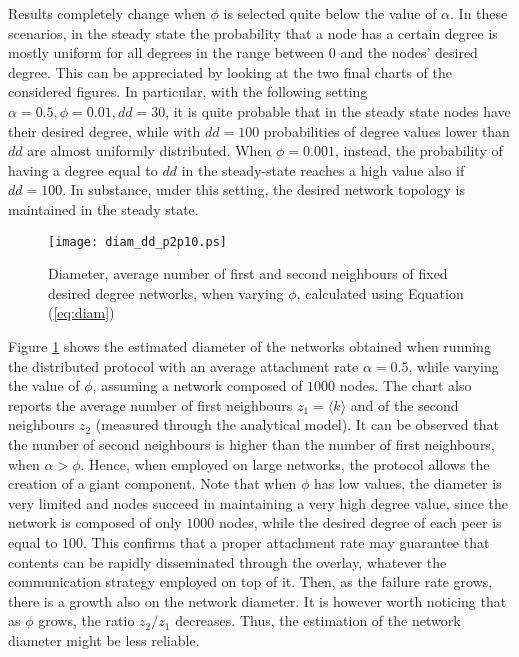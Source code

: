 \documentclass[a4paper,twosided]{article}
\begin{document}
Results completely change when $\phi$ is selected quite below the value of $\alpha$. In these scenarios, in the steady state the probability that a node has a certain degree is mostly uniform for all degrees in the range between $0$ and the nodes' desired degree. This can be appreciated by looking at the two final charts of the considered figures.
In particular, with the following setting $\alpha = 0.5, \phi = 0.01, dd=30$, it is quite probable that in the steady state nodes have their desired degree, while with $dd=100$ probabilities of degree values lower than $dd$ are almost uniformly distributed. When $\phi=0.001$, instead, the probability of having a degree equal to $dd$ in the steady-state reaches a high value also if $dd=100$. In substance, under this setting, the desired network topology is maintained in the steady state.

\begin{figure}
   \centering
   \texttt{[image: diam\_dd\_p2p10.ps]}
   \caption{Diameter, average number of first and second neighbours of fixed desired degree networks, when varying $\phi$, calculated using Equation (\ref{eq:diam})}
   \label{fig:diam_dd}
\end{figure}

Figure \ref{fig:diam_dd} shows the estimated diameter of the networks obtained when running the distributed protocol with an average attachment rate $\alpha=0.5$, while varying the value of $\phi$, assuming a network composed of $1000$ nodes. The chart also reports the average number of first neighbours $z_1 = \langle k \rangle$ and of the second neighbours $z_2$ (measured through the analytical model). It can be observed that the number of second neighbours is higher than the number of first neighbours, when $\alpha > \phi$. Hence, when employed on large networks, the protocol allows the creation of a giant component. Note that when $\phi$ has low values, the diameter is very limited and nodes succeed in maintaining a very high degree value, since the network is composed of only $1000$ nodes, while the desired degree of each peer is equal to $100$. This confirms that a proper attachment rate may guarantee that contents can be rapidly disseminated through the overlay, whatever the communication strategy employed on top of it. Then, as the failure rate grows, there is a growth also on the network diameter. It is however worth noticing that as $\phi$ grows, the ratio $z_2 /z_1$ decreases. Thus, the estimation of the network diameter might be less reliable.
\end{document}
